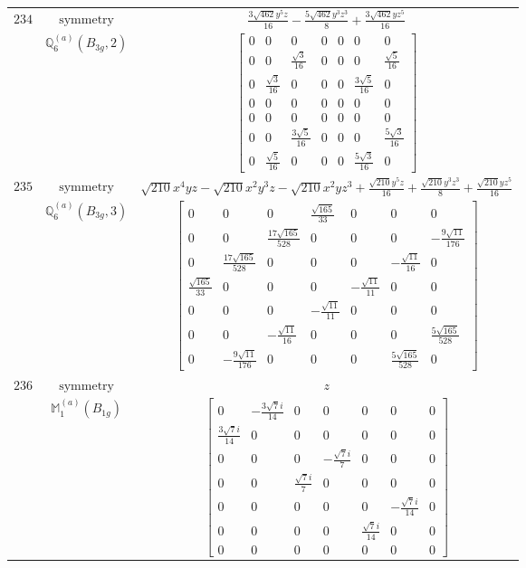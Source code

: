 \documentclass[fleqn,8pt,landscape]{jsarticle}
\begin{document}
\begin{longtable}{ccc}
$ 234 $ & $ \text{symmetry} $ & $ \frac{3 \sqrt{462} y^{5} z}{16} - \frac{5 \sqrt{462} y^{3} z^{3}}{8} + \frac{3 \sqrt{462} y z^{5}}{16} $ \\
$  $ & $ \mathbb{Q}_{6}^{(a)}(B_{3g},2) $ & $ \begin{bmatrix} 0 & 0 & 0 & 0 & 0 & 0 & 0 \\ 0 & 0 & \frac{\sqrt{3}}{16} & 0 & 0 & 0 & \frac{\sqrt{5}}{16} \\ 0 & \frac{\sqrt{3}}{16} & 0 & 0 & 0 & \frac{3 \sqrt{5}}{16} & 0 \\ 0 & 0 & 0 & 0 & 0 & 0 & 0 \\ 0 & 0 & 0 & 0 & 0 & 0 & 0 \\ 0 & 0 & \frac{3 \sqrt{5}}{16} & 0 & 0 & 0 & \frac{5 \sqrt{3}}{16} \\ 0 & \frac{\sqrt{5}}{16} & 0 & 0 & 0 & \frac{5 \sqrt{3}}{16} & 0 \end{bmatrix} $ \\ \hline
$ 235 $ & $ \text{symmetry} $ & $ \sqrt{210} x^{4} y z - \sqrt{210} x^{2} y^{3} z - \sqrt{210} x^{2} y z^{3} + \frac{\sqrt{210} y^{5} z}{16} + \frac{\sqrt{210} y^{3} z^{3}}{8} + \frac{\sqrt{210} y z^{5}}{16} $ \\
$  $ & $ \mathbb{Q}_{6}^{(a)}(B_{3g},3) $ & $ \begin{bmatrix} 0 & 0 & 0 & \frac{\sqrt{165}}{33} & 0 & 0 & 0 \\ 0 & 0 & \frac{17 \sqrt{165}}{528} & 0 & 0 & 0 & - \frac{9 \sqrt{11}}{176} \\ 0 & \frac{17 \sqrt{165}}{528} & 0 & 0 & 0 & - \frac{\sqrt{11}}{16} & 0 \\ \frac{\sqrt{165}}{33} & 0 & 0 & 0 & - \frac{\sqrt{11}}{11} & 0 & 0 \\ 0 & 0 & 0 & - \frac{\sqrt{11}}{11} & 0 & 0 & 0 \\ 0 & 0 & - \frac{\sqrt{11}}{16} & 0 & 0 & 0 & \frac{5 \sqrt{165}}{528} \\ 0 & - \frac{9 \sqrt{11}}{176} & 0 & 0 & 0 & \frac{5 \sqrt{165}}{528} & 0 \end{bmatrix} $ \\ \hline
$ 236 $ & $ \text{symmetry} $ & $ z $ \\
$  $ & $ \mathbb{M}_{1}^{(a)}(B_{1g}) $ & $ \begin{bmatrix} 0 & - \frac{3 \sqrt{7} i}{14} & 0 & 0 & 0 & 0 & 0 \\ \frac{3 \sqrt{7} i}{14} & 0 & 0 & 0 & 0 & 0 & 0 \\ 0 & 0 & 0 & - \frac{\sqrt{7} i}{7} & 0 & 0 & 0 \\ 0 & 0 & \frac{\sqrt{7} i}{7} & 0 & 0 & 0 & 0 \\ 0 & 0 & 0 & 0 & 0 & - \frac{\sqrt{7} i}{14} & 0 \\ 0 & 0 & 0 & 0 & \frac{\sqrt{7} i}{14} & 0 & 0 \\ 0 & 0 & 0 & 0 & 0 & 0 & 0 \end{bmatrix} $ \\ \hline

\end{longtable}
\end{document}

